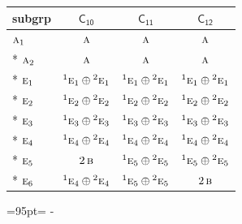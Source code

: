 \documentclass[10pt,a4paper]{article}
\newcommand{\needspace}[1]{\par\penalty-100\begingroup\dimen0=#1\relax\dimen2=\pagegoal
  \advance\dimen2-\pagetotal\ifdim\dimen0>\dimen2\relax\ifdim\dimen2>0pt\vfil\break\fi\fi
  \endgroup}
\numberwithin{equation}{section}
\newcommand{\grp}[1]{\mathsf{#1}}
\newcommand{\irr}[1]{\text{\normalfont\scshape #1}}
\newcommand{\conjpair}[1]{{}^{#1}}
\begin{document}
{\small\begin{longtable}{@{}lccc@{}}\toprule
subgrp & \href{C10.pdf}{$\grp{C_{10}}$} & \href{C11.pdf}{$\grp{C_{11}}$} & \href{C12.pdf}{$\grp{C_{12}}$}\\\midrule\endhead
\bottomrule\endfoot\endlastfoot
$\irr{a}_{1}$ & $\irr{a}$ & $\irr{a}$ & $\irr{a}$\\*
$\irr{a}_{2}$ & $\irr{a}$ & $\irr{a}$ & $\irr{a}$\\*
$\irr{e}_{1}$ & $\conjpair{1}\irr{e}_{1}\oplus \conjpair{2}\irr{e}_{1}$ & $\conjpair{1}\irr{e}_{1}\oplus \conjpair{2}\irr{e}_{1}$ & $\conjpair{1}\irr{e}_{1}\oplus \conjpair{2}\irr{e}_{1}$\\*
$\irr{e}_{2}$ & $\conjpair{1}\irr{e}_{2}\oplus \conjpair{2}\irr{e}_{2}$ & $\conjpair{1}\irr{e}_{2}\oplus \conjpair{2}\irr{e}_{2}$ & $\conjpair{1}\irr{e}_{2}\oplus \conjpair{2}\irr{e}_{2}$\\*
$\irr{e}_{3}$ & $\conjpair{1}\irr{e}_{3}\oplus \conjpair{2}\irr{e}_{3}$ & $\conjpair{1}\irr{e}_{3}\oplus \conjpair{2}\irr{e}_{3}$ & $\conjpair{1}\irr{e}_{3}\oplus \conjpair{2}\irr{e}_{3}$\\*
$\irr{e}_{4}$ & $\conjpair{1}\irr{e}_{4}\oplus \conjpair{2}\irr{e}_{4}$ & $\conjpair{1}\irr{e}_{4}\oplus \conjpair{2}\irr{e}_{4}$ & $\conjpair{1}\irr{e}_{4}\oplus \conjpair{2}\irr{e}_{4}$\\*
$\irr{e}_{5}$ & $2\,\irr{b}$ & $\conjpair{1}\irr{e}_{5}\oplus \conjpair{2}\irr{e}_{5}$ & $\conjpair{1}\irr{e}_{5}\oplus \conjpair{2}\irr{e}_{5}$\\*
$\irr{e}_{6}$ & $\conjpair{1}\irr{e}_{4}\oplus \conjpair{2}\irr{e}_{4}$ & $\conjpair{1}\irr{e}_{5}\oplus \conjpair{2}\irr{e}_{5}$ & $2\,\irr{b}$\\
\bottomrule\end{longtable}}

\needspace{95pt}
\end{document}
